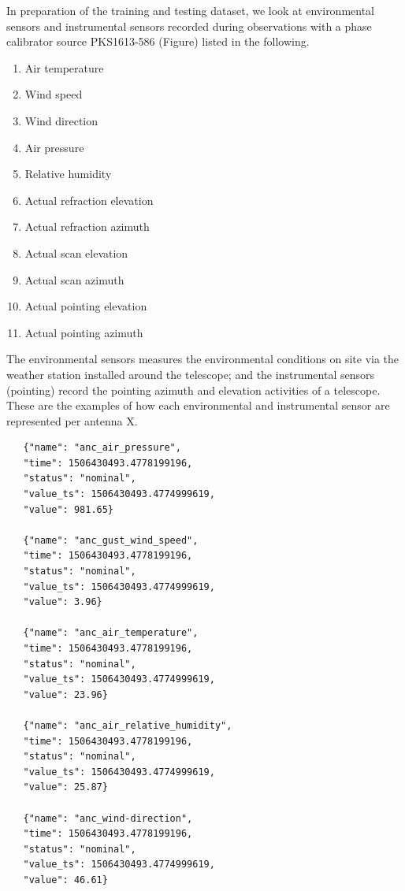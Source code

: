 In preparation of the training and testing dataset, we look at environmental sensors and instrumental sensors
recorded during observations with a phase calibrator source
PKS1613-586 (Figure) listed in the following. 
\begin{enumerate}

\item Air temperature
\item Wind speed
\item Wind direction 
\item Air pressure 
\item Relative humidity 
\item Actual refraction elevation
\item Actual refraction azimuth
\item Actual scan elevation
\item Actual scan azimuth 
\item Actual pointing elevation
\item Actual pointing azimuth 
\end{enumerate}
The environmental sensors measures the environmental conditions on site via the weather station installed around the telescope; and the instrumental sensors (pointing) record the pointing azimuth and elevation activities of a telescope. These are the examples of how each environmental and instrumental sensor are represented per antenna X.

 
\begin{tcolorbox}
\begin{lstlisting}
   {"name": "anc_air_pressure",
   "time": 1506430493.4778199196,
   "status": "nominal",
   "value_ts": 1506430493.4774999619,
   "value": 981.65}
   
   {"name": "anc_gust_wind_speed",
   "time": 1506430493.4778199196,
   "status": "nominal",
   "value_ts": 1506430493.4774999619,
   "value": 3.96}

   {"name": "anc_air_temperature",
   "time": 1506430493.4778199196,
   "status": "nominal",
   "value_ts": 1506430493.4774999619,
   "value": 23.96}

   {"name": "anc_air_relative_humidity",
   "time": 1506430493.4778199196,
   "status": "nominal",
   "value_ts": 1506430493.4774999619,
   "value": 25.87}

   {"name": "anc_wind-direction",
   "time": 1506430493.4778199196,
   "status": "nominal",
   "value_ts": 1506430493.4774999619,
   "value": 46.61}
  
\end{lstlisting}
\end{tcolorbox}

